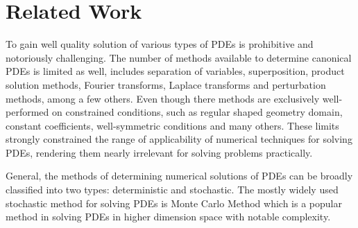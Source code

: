 \section{Related Work}

To gain well quality solution of various types of PDEs is prohibitive and notoriously challenging.
The number of methods available to determine canonical PDEs is limited as well,
includes 
separation of variables, 
superposition, 
product solution methods, 
Fourier transforms, 
Laplace transforms and 
perturbation methods, 
among a few others.
Even though there methods are exclusively well-performed on constrained conditions,
such as regular shaped geometry domain, constant coefficients, well-symmetric conditions 
and many others.
These limits strongly constrained the range of applicability of numerical techniques for solving PDEs,
rendering them nearly irrelevant for solving problems practically.

General, the methods of determining numerical solutions of PDEs can be broadly classified into
two types: 
deterministic 
and stochastic. 
The mostly widely used stochastic method for solving PDEs is 
Monte Carlo Method \cite{Monte_Carlo_Method} which is a popular method in solving PDEs in higher dimension space with 
notable complexity.

